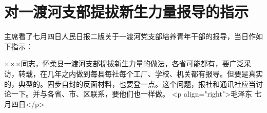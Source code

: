 \section[对一渡河支部提拔新生力量报导的指示（一九六四年七月四日）]{对一渡河支部提拔新生力量报导的指示}


主席看了七月四日人民日报二版关于一渡河党支部培养青年干部的报导，当日作如下指示：

×××同志，怀柔县一渡河支部提拔新生力量的做法，各省可能都有，要广泛采访，转载，在几年之内做到每县每社每个工厂、学校、机关都有报导。但要是真实的，典型的。固步自封的反面材料，也要登一点。这个问题，报社和通讯社应当讨论一下。并与各省、市、区联系，要他们也一样做。
<p align="right">毛泽东
七月四日</p>


